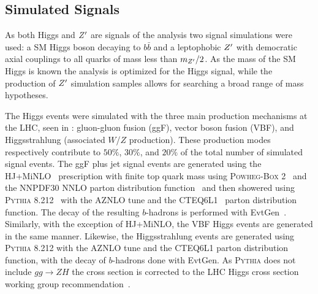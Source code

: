 \subsection{Simulated Signals}\label{sec:simulation_signal}

As both Higgs and $Z'$ are signals of the analysis two signal simulations were used: a SM Higgs boson decaying to $b\bar{b}$ and a leptophobic $Z'$ with democratic axial couplings to all quarks of mass less than $m_{Z'}/2$.
As the mass of the SM Higgs is known the analysis is optimized for the Higgs signal, while the production of $Z'$ simulation samples allows for searching a broad range of mass hypotheses.

The Higgs events were simulated with the three main production mechanisms at the LHC, seen in : gluon-gluon fusion (ggF), vector boson fusion (VBF), and Higgsstrahlung (associated $W$/$Z$ production).
These production modes respectively contribute to $50\%$, $30\%$, and $20\%$ of the total number of simulated signal events.
The ggF plus jet signal events are generated using the HJ+MiNLO~\cite{Hamilton:2015nsa} prescription with finite top quark mass using \textsc{Powheg-Box} 2~\cite{Campbell:2012am} and the NNPDF30 NNLO parton distribution function~\cite{Hamilton:2012rf} and then showered using \textsc{Pythia} 8.212~\cite{Sjostrand:2014zea} with the AZNLO tune and the CTEQ6L1~\cite{Pumplin:2002vw} parton distribution function.
The decay of the resulting $b$-hadrons is performed with EvtGen~\cite{Lange:2001uf}.
Similarly, with the exception of HJ+MiNLO, the VBF Higgs events are generated in the same manner.
Likewise, the Higgsstrahlung events are generated using \textsc{Pythia} 8.212 with the AZNLO tune and the CTEQ6L1 parton distribution function, with the decay of $b$-hadrons done with EvtGen.
As \textsc{Pythia} does not include $gg \to ZH$ the cross section is corrected to the LHC Higgs cross section working group recommendation~\cite{MelladoGarcia:2150771}.

